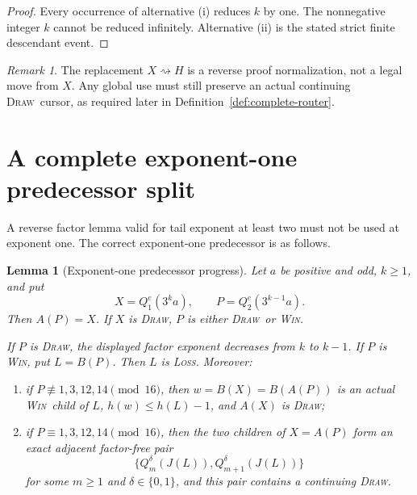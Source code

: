 \documentclass[11pt,a4paper]{article}
\newtheorem{lemma}[theorem]{Lemma}
\theoremstyle{definition}
\theoremstyle{remark}
\newtheorem{remark}[theorem]{Remark}
\newcommand{\WIN}{\textnormal{\textsc{Win}}}
\newcommand{\LOSS}{\textnormal{\textsc{Loss}}}
\newcommand{\DRAW}{\textnormal{\textsc{Draw}}}
\begin{document}
\begin{proof}
Every occurrence of alternative (i) reduces $k$ by one.  The nonnegative
integer $k$ cannot be reduced infinitely.  Alternative (ii) is the stated
strict finite descendant event.
\end{proof}

\begin{remark}
The replacement $X\rightsquigarrow H$ is a reverse proof normalization,
not a legal move from $X$.  Any global use must still preserve an actual
continuing \DRAW\ cursor, as required later in
Definition~\ref{def:complete-router}.
\end{remark}

\section{A complete exponent-one predecessor split}

A reverse factor lemma valid for tail exponent at least two must not be used
at exponent one.  The correct exponent-one predecessor is as follows.

\begin{lemma}[Exponent-one predecessor progress]\label{lem:exp-one-progress}
Let $a$ be positive and odd, $k\ge1$, and put
\[
 X=Q_1^e(3^k a),
 \qquad
 P=Q_2^e(3^{k-1}a).
\]
Then $A(P)=X$.  If $X$ is \DRAW, $P$ is either \DRAW\ or \WIN.

If $P$ is \DRAW, the displayed factor exponent decreases from $k$ to
$k-1$.  If $P$ is \WIN, put $L=B(P)$.  Then $L$ is \LOSS.  Moreover:
\begin{enumerate}[label=(\alph*)]
\item if $P\not\equiv1,3,12,14\pmod{16}$, then
      $w=B(X)=B(A(P))$ is an actual \WIN\ child of $L$,
      $h(w)\le h(L)-1$, and $A(X)$ is \DRAW;
\item if $P\equiv1,3,12,14\pmod{16}$, then the two children of
      $X=A(P)$ form an exact adjacent factor-free pair
      \[
        \{Q_m^\delta(J(L)),Q_{m+1}^\delta(J(L))\}
      \]
      for some $m\ge1$ and $\delta\in\{0,1\}$, and this pair contains a
      continuing \DRAW.
\end{enumerate}
\end{lemma}
\end{document}
